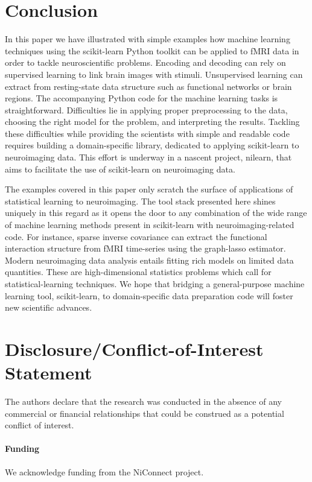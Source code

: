 \documentclass{frontiersSCNS} %
\begin{document}
\section{Conclusion}

In this paper we have illustrated with simple examples how machine
learning techniques using the scikit-learn Python toolkit can be applied
to fMRI data in order to tackle
neuroscientific problems. Encoding and decoding can rely on supervised
learning to link brain images with stimuli. Unsupervised learning
can extract from resting-state data structure such as functional networks or
brain regions. The accompanying Python code for the machine learning
tasks is straightforward. Difficulties lie in applying proper 
preprocessing to the data, choosing the right model for the problem,
and interpreting the results. Tackling these difficulties while
providing the scientists with simple and readable code requires building
a domain-specific library, dedicated to applying scikit-learn to
neuroimaging data. This effort is underway in a nascent project, nilearn,
that aims to facilitate the use of scikit-learn on neuroimaging data.

The examples covered in this paper only scratch the
surface of applications of statistical learning to neuroimaging.
The tool stack presented here shines uniquely in this regard as it opens the
door to any combination of the wide range of machine learning methods
present in scikit-learn with neuroimaging-related code. For
instance, sparse inverse covariance can extract the functional 
interaction structure from fMRI time-series \citep{varoquaux2013} using
the graph-lasso estimator.
Modern neuroimaging data analysis entails fitting rich models on
limited data quantities. These are high-dimensional statistics problems
which call
for statistical-learning techniques. We hope that bridging a
general-purpose machine learning tool, scikit-learn, to domain-specific
data preparation code will foster new scientific advances.


\section*{Disclosure/Conflict-of-Interest Statement}
The authors declare that the research was conducted in the absence of any
commercial or financial relationships that could be construed as a potential
conflict of interest.

\paragraph{Funding\textcolon} We acknowledge funding from the NiConnect project.


\end{document}
